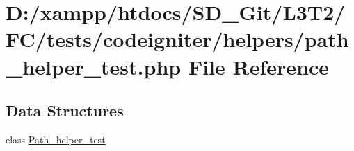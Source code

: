 \hypertarget{path__helper__test_8php}{}\section{D\+:/xampp/htdocs/\+S\+D\+\_\+\+Git/\+L3\+T2/\+F\+C/tests/codeigniter/helpers/path\+\_\+helper\+\_\+test.php File Reference}
\label{path__helper__test_8php}
\subsection*{Data Structures}
\begin{DoxyCompactItemize}
\item 
class \hyperlink{class_path__helper__test}{Path\+\_\+helper\+\_\+test}
\end{DoxyCompactItemize}
